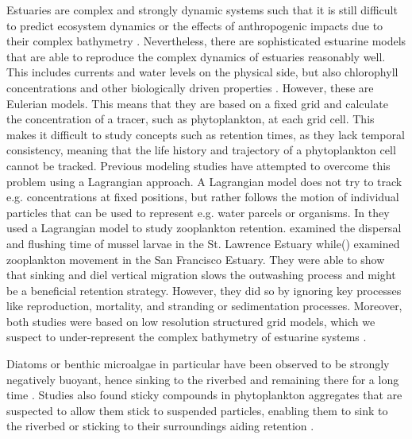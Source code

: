 \documentclass[npg, manuscript]{copernicus}
\begin{document}
Estuaries are complex and strongly dynamic systems such that it is still difficult to predict ecosystem dynamics or the effects of anthropogenic impacts due to their complex bathymetry \citep{Michael2016, Fringer2019}. 
Nevertheless, there are sophisticated estuarine models that are able to reproduce the complex dynamics of estuaries reasonably well. This includes currents and water levels on the physical side, but also chlorophyll concentrations and other biologically driven properties \citep{Pein2021, Schol2014}.
However, these are Eulerian models.
This means that they are based on a fixed grid and calculate the concentration of a tracer, such as phytoplankton, at each grid cell.
This makes it difficult to study concepts such as retention times, as they lack temporal consistency, meaning that the life history and trajectory of a phytoplankton cell cannot be tracked.
Previous modeling studies have attempted to overcome this problem using a Lagrangian approach.
A Lagrangian model does not try to track e.g. concentrations at fixed positions, but rather follows the motion of individual particles that can be used to represent e.g. water parcels or organisms.
In \citet{Simons2006,Kimmerer2014} they used a Lagrangian model to study zooplankton retention.
\citet{Simons2006} examined the dispersal and flushing time of mussel larvae in the St. Lawrence Estuary while() \citep{Kimmerer2014} examined zooplankton movement in the San Francisco Estuary.
They were able to show that sinking and diel vertical migration slows the outwashing process and might be a beneficial retention strategy.
However, they did so by ignoring key processes like reproduction, mortality, and stranding or sedimentation processes.
Moreover, both studies were based on low resolution structured grid models, which we suspect to under-represent the complex bathymetry of estuarine systems \citep{Ye2018}.

Diatoms or benthic microalgae in particular have been observed to be strongly negatively buoyant, hence sinking to the riverbed and remaining there for a long time \citep{Passow1991,ThomasAnderson1998}.
Studies also found sticky compounds in phytoplankton aggregates that are suspected to allow them stick to suspended particles, enabling them to sink to the riverbed or sticking to their surroundings aiding retention \citep{Kiørboe1993,VanderLee2000}.
\end{document}
